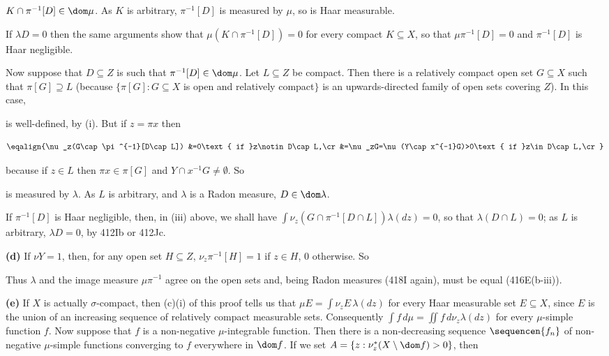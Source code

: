 {\noindent $K\cap\pi^{-1}[D]\in\dom\mu$.   As $K$ is arbitrary,
$\pi^{-1}[D]$ is measured by $\mu$, so is Haar measurable.\ \Qed

If $\lambda D=0$ then the same arguments show that
$\mu(K\cap\pi^{-1}[D])=0$ for every compact $K\subseteq X$, so that
$\mu\pi^{-1}[D]=0$ and $\pi^{-1}[D]$ is Haar negligible.

\medskip

 Now suppose that $D\subseteq Z$ is such that
$\pi^{-1}[D]\in\dom\mu$.   Let $L\subseteq Z$ be compact.   Then there
is a relatively compact open set $G\subseteq X$ such that
$\pi[G]\supseteq L$ (because $\{\pi[G]:G\subseteq X$ is open and
relatively compact$\}$ is an upwards-directed family of open sets
covering $Z$).   In this case,


\noindent is well-defined, by (i).   But  if $z=\pi x$ then

$$\eqalign{\nu_z(G\cap\pi^{-1}[D\cap L])
&=0\text{ if }z\notin D\cap L,\cr
&=\nu_zG=\nu(Y\cap x^{-1}G)>0\text{ if }z\in D\cap L,\cr}$$

\noindent because if $z\in L$ then $\pi x\in\pi[G]$ and
$Y\cap x^{-1}G\ne\emptyset$.   So


\noindent is measured by $\lambda$.   As $L$ is arbitrary, and $\lambda$
is a Radon measure, $D\in\dom\lambda$.

\medskip

 If $\pi^{-1}[D]$ is Haar negligible, then, in (iii) above,
we shall have $\int\nu_z(G\cap\pi^{-1}[D\cap L])\lambda(dz)=0$, so
that $\lambda(D\cap L)=0$;  as $L$ is arbitrary, $\lambda D=0$,
by 412Ib or 412Jc.

\medskip

{\bf (d)} If $\nu Y=1$, then, for any open set $H\subseteq Z$,
$\nu_z\pi^{-1}[H]=1$ if $z\in H$, $0$ otherwise.   So


\noindent Thus $\lambda$ and the image measure $\mu\pi^{-1}$ agree on
the open sets and, being Radon measures (418I again), must be equal
(416E(b-iii)).

\medskip

{\bf (e)} If $X$ is actually $\sigma$-compact, then (c)(i) of this proof
tells us that
$\mu E=\int\nu_zE\,\lambda(dz)$ for every Haar measurable set
$E\subseteq X$, since $E$ is the union of an increasing sequence of
relatively compact measurable sets.   Consequently
$\int f\,d\mu=\iint f\,d\nu_z\lambda(dz)$ for every $\mu$-simple
function $f$.
Now suppose that $f$ is a non-negative
$\mu$-integrable function.   Then
there is a non-decreasing sequence $\sequencen{f_n}$ of non-negative
$\mu$-simple functions converging to $f$ everywhere in $\dom f$.   If we
set $A=\{z:\nu_z^*(X\setminus\dom f)>0\}$, then

}
